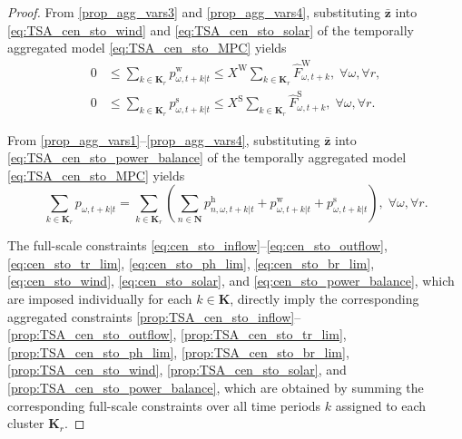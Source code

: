 \documentclass[10pt,a4paper]{amsart}
\begin{document}
\begin{proof}
From \eqref{prop_agg_vars3} and \eqref{prop_agg_vars4},
substituting $\boldsymbol{\bar{z}}$ into
\eqref{eq:TSA_cen_sto_wind} and \eqref{eq:TSA_cen_sto_solar}
of the temporally aggregated model \eqref{eq:TSA_cen_sto_MPC} yields
\begin{align}
0 & \leq
\sum_{k \in \boldsymbol{K}_r} p^{\mathrm{w}}_{\omega, t+k|t}
\leq X^{\mathrm{W}} \sum_{k \in \boldsymbol{K}_r} \hat{F}^{\mathrm{W}}_{\omega, t+k},
\; \forall \omega, \forall r,
\label{prop:TSA_cen_sto_wind}\\
0 & \leq
\sum_{k \in \boldsymbol{K}_r} p^{\mathrm{s}}_{\omega, t+k|t}
\leq X^{\mathrm{S}} \sum_{k \in \boldsymbol{K}_r} \hat{F}^{\mathrm{S}}_{\omega, t+k},
\; \forall \omega, \forall r.
\label{prop:TSA_cen_sto_solar}
\end{align}

From \eqref{prop_agg_vars1}--\eqref{prop_agg_vars4},
substituting $\boldsymbol{\bar{z}}$ into
\eqref{eq:TSA_cen_sto_power_balance}
of the temporally aggregated model \eqref{eq:TSA_cen_sto_MPC} yields
\begin{equation}
\sum_{k \in \boldsymbol{K}_r} p_{\omega, t+k|t}
=
\sum_{k \in \boldsymbol{K}_r} \left(
\sum_{n \in \boldsymbol{N}} p^{\mathrm{h}}_{n, \omega, t+k|t} + p^{\mathrm{w}}_{\omega, t+k|t} + p^{\mathrm{s}}_{\omega, t+k|t}
\right), \; \forall \omega, \forall r.
\label{prop:TSA_cen_sto_power_balance}
\end{equation}

The full-scale constraints
\eqref{eq:cen_sto_inflow}--\eqref{eq:cen_sto_outflow},
\eqref{eq:cen_sto_tr_lim}, \eqref{eq:cen_sto_ph_lim}, \eqref{eq:cen_sto_br_lim},
\eqref{eq:cen_sto_wind}, \eqref{eq:cen_sto_solar}, and \eqref{eq:cen_sto_power_balance},
which are imposed individually for each $k \in \boldsymbol{K}$,
directly imply the corresponding aggregated constraints
\eqref{prop:TSA_cen_sto_inflow}--\eqref{prop:TSA_cen_sto_outflow},
\eqref{prop:TSA_cen_sto_tr_lim}, \eqref{prop:TSA_cen_sto_ph_lim}, \eqref{prop:TSA_cen_sto_br_lim},
\eqref{prop:TSA_cen_sto_wind}, \eqref{prop:TSA_cen_sto_solar}, and \eqref{prop:TSA_cen_sto_power_balance},
which are obtained by summing the corresponding full-scale constraints over all time periods $k$ assigned to each cluster $\boldsymbol{K}_r$.


\end{proof}
\end{document}
